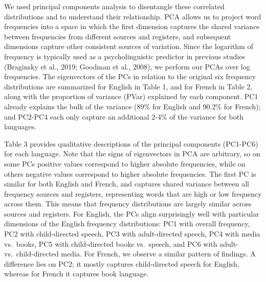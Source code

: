 \documentclass[10pt, letterpaper]{article}
\begin{document}
We used principal components analysis to disentangle these correlated
distributions and to understand their relationship. PCA allows us to
project word frequencies into a space in which the first dimension
captures the shared variance between frequencies from different sources
and registers, and subsequent dimensions capture other consistent
sources of variation. Since the logarithm of frequency is typically used
as a psycholinguistic predictor in previous studies (Braginsky et al.,
2019; Goodman et al., 2008), we perform our PCAs over log frequencies.
The eigenvectors of the PCs in relation to the original six frequency
distributions are summarized for English in Table 1, and for French in
Table 2, along with the proportion of variance (PVar) explained by each
component. PC1 already explains the bulk of the variance (89\% for
English and 90.2\% for French); and PC2-PC4 each only capture an
additional 2-4\% of the variance for both languages.

Table 3 provides qualitative descriptions of the principal components
(PC1-PC6) for each language. Note that the signs of eigenvectors in PCA
are arbitrary, so on some PCs positive values correspond to higher
absolute frequencies, while on others negative values correspond to
higher absolute frequencies. The first PC is similar for both English
and French, and captures shared variance between all frequency sources
and registers, representing words that are high or low frequency across
them. This means that frequency distributions are largely similar across
sources and registers. For English, the PCs align surprisingly well with
particular dimensions of the English frequency distributions: PC1 with
overall frequency, PC2 with child-directed speech, PC3 with
adult-directed speech, PC4 with media vs.~books, PC5 with child-directed
books vs.~speech, and PC6 with adult- vs.~child-directed media. For
French, we observe a similar pattern of findings. A difference lies on
PC2; it mostly captures child-directed speech for English, whereas for
French it captures book language.
\end{document}
